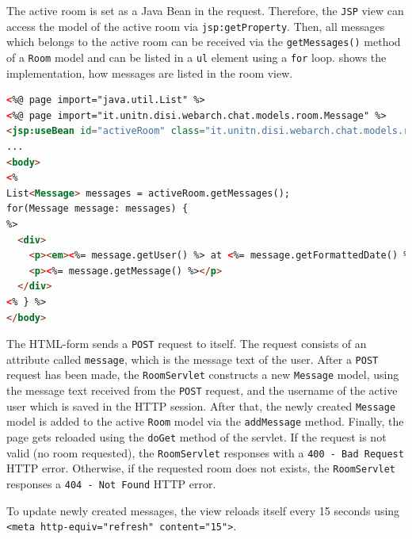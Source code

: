 The active room is set as a Java Bean in the request. Therefore, the \texttt{JSP} view can access the model of the active room via \texttt{jsp:getProperty}. Then, all messages which belongs to the active room can be received via the \texttt{getMessages()} method of a \texttt{Room} model and can be listed in a \texttt{ul} element using a \texttt{for} loop.  shows the implementation, how messages are listed in the room view.
\begin{lstlisting}[label=lst:03_impl_servlets_room_bean, caption=List messages for a specific room, language=html]
<%@ page import="java.util.List" %>
<%@ page import="it.unitn.disi.webarch.chat.models.room.Message" %>
<jsp:useBean id="activeRoom" class="it.unitn.disi.webarch.chat.models.room.Room" scope="request" />
...
<body>
<%
List<Message> messages = activeRoom.getMessages();
for(Message message: messages) {
%>
  <div>
    <p><em><%= message.getUser() %> at <%= message.getFormattedDate() %>:</em></p>
    <p><%= message.getMessage() %></p>
  </div>
<% } %>
</body>
\end{lstlisting}

The HTML-form sends a \texttt{POST} request to itself. The request consists of an attribute called \texttt{message}, which is the message text of the user. After a \texttt{POST} request has been made, the \texttt{RoomServlet} constructs a new \texttt{Message} model, using the message text received from the \texttt{POST} request, and the username of the active user which is saved in the HTTP session. After that, the newly created \texttt{Message} model is added to the active \texttt{Room} model via the \texttt{addMessage} method. Finally, the page gets reloaded using the \texttt{doGet} method of the servlet. If the request is not valid (no room requested), the \texttt{RoomServlet} responses with a \texttt{400 - Bad Request} HTTP error. Otherwise, if the requested room does not exists, the \texttt{RoomServlet} responses a \texttt{404 - Not Found} HTTP error.

To update newly created messages, the view reloads itself every 15 seconds using \texttt{<meta http-equiv="refresh" content="15">}.


\newpage
